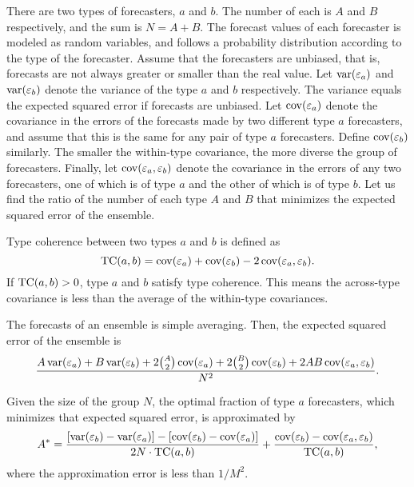 \documentclass[../main.tex]{subfiles}
\begin{document}
There are two types of forecasters, $a$ and $b$.  The number of each is $A$ and $B$ respectively, and the sum is $N = A + B$.
The forecast values of each forecaster is modeled as random variables, and follows a probability distribution according to the type of the forecaster.
Assume that the forecasters are unbiased, that is, forecasts are not always greater or smaller than the real value.
Let $\operatorname{var}(\varepsilon_a)$ and $\operatorname{var}(\varepsilon_b)$ denote the variance of the type $a$ and $b$ respectively.
The variance equals the expected squared error if forecasts are unbiased.
Let $\operatorname{cov}(\varepsilon_a)$ denote the covariance in the errors of the forecasts made by two different type $a$ forecasters, and assume that this is the same for any pair of type $a$ forecasters.  Define $\operatorname{cov}(\varepsilon_b)$ similarly.
The smaller the within-type covariance, the more diverse the group of forecasters.
Finally, let $\operatorname{cov}(\varepsilon_a,\varepsilon_b)$ denote the covariance in the errors of any two forecasters, one of which is of type $a$ and the other of which is of type $b$.
Let us find the ratio of the number of each type $A$ and $B$ that minimizes the expected squared error of the ensemble.

Type coherence between two types $a$ and $b$ is defined as
\begin{equation}
  \operatorname{TC}(a, b) = \operatorname{cov}(\varepsilon_a) + \operatorname{cov}(\varepsilon_b) - 2\operatorname{cov}(\varepsilon_a, \varepsilon_b).
\end{equation}
If $\operatorname{TC}(a, b) > 0$, type $a$ and $b$ satisfy type coherence.
This means the across-type covariance is less than the average of the within-type covariances.

The forecasts of an ensemble is simple averaging.
Then, the expected squared error of the ensemble is
\begin{equation}
  \frac{A\operatorname{var}(\varepsilon_a) + B\operatorname{var}(\varepsilon_b) + 2\binom{A}{2}\operatorname{cov}(\varepsilon_a) + 2\binom{B}{2}\operatorname{cov}(\varepsilon_b) + 2AB\operatorname{cov}(\varepsilon_a,\varepsilon_b)}{N^2}.
  \label{eq: lamberson}
\end{equation}

Given the size of the group $N$, the optimal fraction of type $a$ forecasters, which minimizes that expected squared error, is approximated by
\begin{equation}
  A^\ast = \frac{[\operatorname{var}(\varepsilon_b) - \operatorname{var}(\varepsilon_a)] - [\operatorname{cov}(\varepsilon_b) - \operatorname{cov}(\varepsilon_a)]}{2N \cdot \operatorname{TC}(a, b)} + \frac{\operatorname{cov}(\varepsilon_b) - \operatorname{cov}(\varepsilon_a, \varepsilon_b)}{\operatorname{TC}(a, b)},
  \label{eq: optimal A}
\end{equation}
where the approximation error is less than $1/M^2$.
\end{document}
